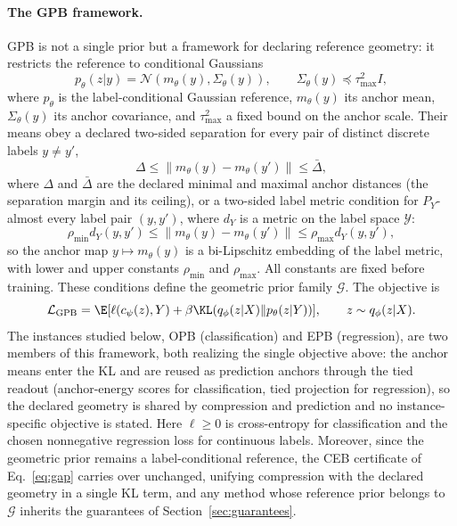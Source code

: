 \paragraph{The GPB framework.}
GPB is not a single prior but a framework for declaring reference geometry: it
restricts the reference to conditional Gaussians
\begin{equation}
p_\theta(z|y)=\mathcal N(m_\theta(y),\Sigma_\theta(y)),\qquad
\Sigma_\theta(y)\preceq\tau_{\max}^2I,
\label{eq:pgib-covariance}
\end{equation}
where $p_\theta$ is the label-conditional Gaussian reference, $m_\theta(y)$ its
anchor mean, $\Sigma_\theta(y)$ its anchor covariance, and $\tau_{\max}^2$ a fixed
bound on the anchor scale. Their means obey a declared two-sided separation for
every pair of distinct discrete labels $y\ne y'$,
\begin{equation}
\Delta\le\|m_\theta(y)-m_\theta(y')\|\le\bar\Delta,
\label{eq:pgib-separation-condition}
\end{equation}
where $\Delta$ and $\bar\Delta$ are the declared minimal and maximal anchor
distances (the separation margin and its ceiling),
or a two-sided label metric condition for $P_Y$-almost every label pair
$(y,y')$, where $d_Y$ is a metric on the label space $\mathcal Y$:
\begin{equation}
\rho_{\min}d_Y(y,y')\le\|m_\theta(y)-m_\theta(y')\|
\le\rho_{\max}d_Y(y,y'),
\label{eq:pgib-lipschitz}
\end{equation}
so the anchor map $y\mapsto m_\theta(y)$ is a bi-Lipschitz embedding of the label
metric, with lower and upper constants $\rho_{\min}$ and $\rho_{\max}$. All
constants are fixed before training. These conditions define the geometric prior
family $\mathcal G$. The objective is
\begin{equation}
\mathcal L_{\rm GPB}=\E[\ell(c_\psi(z),Y)+\beta\KL(q_\phi(z|X)\|p_\theta(z|Y))],
\qquad z\sim q_\phi(z|X).
\label{eq:pgib-objective}
\end{equation}
The instances studied below, OPB (classification) and EPB (regression), are two
members of this framework, both realizing the single objective above: the anchor means
enter the KL and are reused as prediction anchors through the tied readout
(anchor-energy scores for classification, tied projection for regression), so the
declared geometry is shared by compression and prediction and no instance-specific
objective is stated. Here $\ell\ge0$ is cross-entropy for classification and the chosen
nonnegative regression loss for continuous labels. Moreover, since the geometric prior remains a label-conditional reference, the
CEB certificate of Eq.~\eqref{eq:gap} carries over unchanged, unifying
compression with the declared geometry in a single KL term, and any method whose
reference prior belongs to $\mathcal G$ inherits the guarantees of
Section~\ref{sec:guarantees}.

